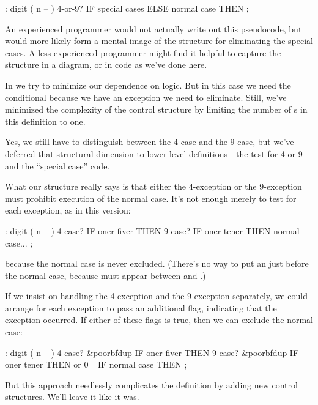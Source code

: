 \begin{Code}
: digit  ( n -- )  4-or-9? IF  special cases
   ELSE  normal case  THEN ;
\end{Code}
An experienced \Forth{} programmer would not actually write out this
pseudocode, but would more likely form a mental image of the structure
for eliminating the special cases. A less experienced programmer might
find it helpful to capture the structure in a diagram, or in code as we've
done here.

In \Forth{} we try to minimize our dependence on logic. But in this case
we need the conditional  because we have an exception we need
to eliminate. Still, we've minimized the complexity of the control
structure by limiting the number of s in this
definition to one.

Yes, we still have to distinguish between the 4-case and the 9-case,
but we've deferred that structural dimension to lower-level
definitions---the test for 4-or-9 and the ``special case'' code.

What our structure really says is that either the 4-exception or the
9-exception must prohibit execution of the normal case. It's not enough
merely to test for each exception, as in this version:

\begin{Code}
: digit  ( n -- )  4-case? IF  oner fiver  THEN
                   9-case? IF  oner tener  THEN
                   normal case... ;
\end{Code}
because the normal case is never excluded. (There's no way to put an
 just before the normal case, because  must
appear between  and .)

If we insist on handling the 4-exception and the 9-exception separately,
we could arrange for each exception to pass an additional flag, indicating
that the exception occurred. If either of these flags is true, then we can
exclude the normal case:

\begin{Code}[commandchars=\&\{\}]
: digit  ( n -- )  4-case? &poorbf{dup} IF  oner fiver  THEN
                   9-case? &poorbf{dup} IF  oner tener  THEN
                   or  0= IF  normal case  THEN ;
\end{Code}
But this approach needlessly complicates the definition by adding new
control structures. We'll leave it like it was.

